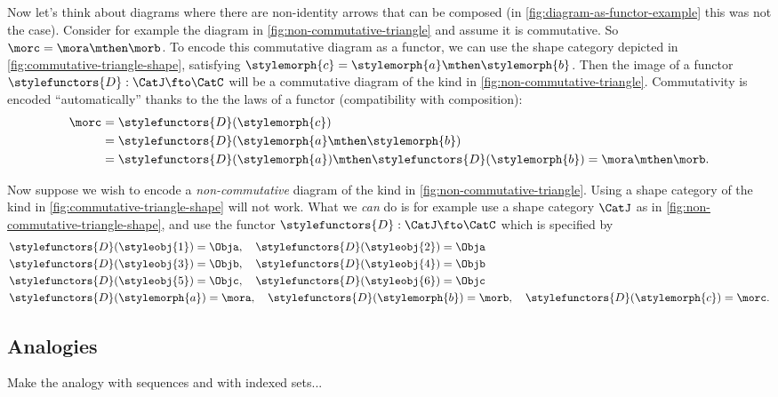 Now let's think about diagrams where there are non-identity arrows that can be composed (in \cref{fig:diagram-as-functor-example} this was not the case). 
Consider for example the diagram in \cref{fig:non-commutative-triangle} and assume it is commutative. So $\morc = \mora \mthen \morb$. To encode this commutative diagram as a functor, we can use the shape category depicted in \cref{fig:commutative-triangle-shape}, satisfying $\stylemorph{c} = \stylemorph{a} \mthen \stylemorph{b}$. Then the image of a functor $\stylefunctors{D}: \CatJ \fto \CatC$ will be a commutative diagram of the kind in \cref{fig:non-commutative-triangle}. Commutativity is encoded ``automatically'' thanks to the the laws of a functor (compatibility with composition): 
\begin{align*}
\morc &= \stylefunctors{D}(\stylemorph{c}) \\
	&= \stylefunctors{D}(\stylemorph{a} \mthen \stylemorph{b}) \\
	&= \stylefunctors{D}(\stylemorph{a}) \mthen \stylefunctors{D}(\stylemorph{b}) = \mora \mthen \morb.
\end{align*}

\begin{marginfigure}
    \centering
    \caption{}
    \label{fig:non-commutative-triangle-shape}
\end{marginfigure}

Now suppose we wish to encode a \emph{non-commutative} diagram of the kind in \cref{fig:non-commutative-triangle}. Using a shape category of the kind in \cref{fig:commutative-triangle-shape} will not work. What we \emph{can} do is for example use a shape category $\CatJ$ as in \cref{fig:non-commutative-triangle-shape}, and use the functor $\stylefunctors{D}: \CatJ \fto \CatC$ which is specified by
\begin{align*}
& \stylefunctors{D}(\styleobj{1}) = \Obja, \quad \stylefunctors{D}(\styleobj{2}) = \Obja  \\
& \stylefunctors{D}(\styleobj{3}) = \Objb, \quad \stylefunctors{D}(\styleobj{4}) = \Objb  \\
& \stylefunctors{D}(\styleobj{5}) = \Objc, \quad \stylefunctors{D}(\styleobj{6}) = \Objc  \\
& \stylefunctors{D}(\stylemorph{a}) = \mora, \quad \stylefunctors{D}(\stylemorph{b}) = \morb, \quad \stylefunctors{D}(\stylemorph{c}) = \morc.
\end{align*}


\subsection{Analogies}

Make the analogy with sequences and with indexed sets... 


